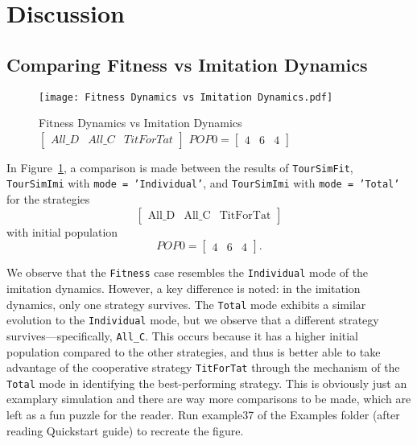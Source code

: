\section{Discussion}
\subsection{Comparing Fitness vs Imitation Dynamics}
	\begin{figure}[h]
	      \centering
	      \texttt{[image: Fitness Dynamics vs Imitation Dynamics.pdf]}
	      \caption{Fitness Dynamics vs Imitation Dynamics $\begin{bmatrix}All\_D&All\_C&TitForTat\end{bmatrix}$ $POP0=\begin{bmatrix}4&6&4\end{bmatrix}$}
	      \label{fig:Fitness Dynamics vs Imitation Dynamics}
	\end{figure}
In Figure~\ref{fig:Fitness Dynamics vs Imitation Dynamics}, a comparison is made between the results of \texttt{TourSimFit}, \texttt{TourSimImi} with \texttt{mode = 'Individual'}, and \texttt{TourSimImi} with \texttt{mode = 'Total'} for the strategies 
\[
\begin{bmatrix} \text{All\_D} & \text{All\_C} & \text{TitForTat} \end{bmatrix}
\]
with initial population 
\[
POP0 = \begin{bmatrix} 4 & 6 & 4 \end{bmatrix}.
\]

We observe that the \texttt{Fitness} case resembles the \texttt{Individual} mode of the imitation dynamics. However, a key difference is noted: in the imitation dynamics, only one strategy survives. The \texttt{Total} mode exhibits a similar evolution to the \texttt{Individual} mode, but we observe that a different strategy survives—specifically, \texttt{All\_C}. This occurs because it has a higher initial population compared to the other strategies, and thus is better able to take advantage of the cooperative strategy \texttt{TitForTat} through the mechanism of the \texttt{Total} mode in identifying the best-performing strategy. This is obviously just an examplary simulation and there are way more comparisons to be made, which are left as a fun puzzle for the reader. Run example37 of the Examples folder (after reading Quickstart guide) to recreate the figure.

